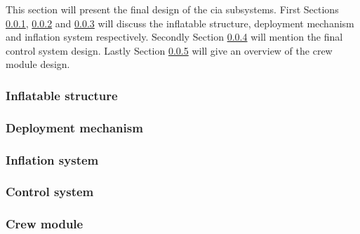 %
This section will present the final design of the \gls{cia} subsystems. First Sections \ref{subsec:infldes}, \ref{subsec:depldes} and \ref{subsec:inflsys} will discuss the inflatable structure, deployment mechanism and inflation system respectively. Secondly Section \ref{subsec:controlsys} will mention the final control system design. Lastly Section \ref{subsec:crewmod} will give an overview of the crew module design.
\subsubsection{Inflatable structure}\label{subsec:infldes}


%

\subsubsection{Deployment mechanism}\label{subsec:depldes}


\subsubsection{Inflation system}\label{subsec:inflsys}


\subsubsection{Control system}\label{subsec:controlsys}


\subsubsection{Crew module}\label{subsec:crewmod}


